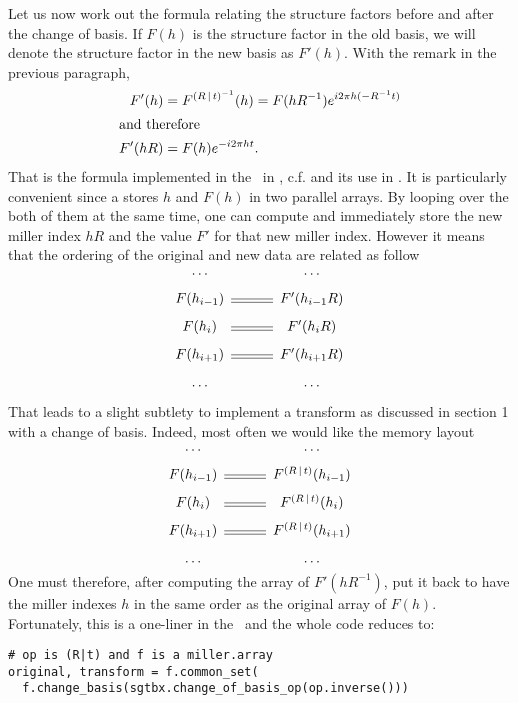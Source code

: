 \documentclass[11pt]{article}
\begin{document}
Let us now work out the formula relating the structure factors before and after the change of basis. If $F(h)$ is the structure factor in the old basis, we will denote the structure factor in the new basis as $F'(h)$. With the remark in the previous paragraph,
\begin{align}
F'(h) &= F^{\left( R\,\vert\, t \right)^{-1}}(h) = F(hR^{-1}) e^{i2\pi h(-R^{-1}t)}\nonumber\\
\intertext{and therefore}
F'(hR) &= F(h)e^{-i2\pi ht}. \label{eqn:change::basis::F}
\end{align}
That is the formula implemented in the \cctbx\ in , c.f.  and its use in . It is particularly convenient since a  stores $h$ and $F(h)$ in two parallel arrays. By looping over the both of them at the same time, one can compute and immediately store the new miller index $hR$ and the value $F'$ for that new miller index. However it means that the ordering of the original and new data are related as follow
\begin{equation}
\begin{CD}
\ldots @. \ldots\\
F(h_{i-1}) @= F'(h_{i-1}R)\\
F(h_i) @= F'(h_iR)\\
F(h_{i+1}) @= F'(h_{i+1}R)\\
\ldots @. \ldots
\end{CD}
\label{eqn:miller::array::change::basis}
\end{equation}

That leads to a slight subtlety to implement a transform as discussed in section 1 with a change of basis. Indeed, most often we would like the memory layout
\begin{equation}
\begin{CD}
\ldots @. \ldots\\
F(h_{i-1}) @= F^{\sym{R}{t}}(h_{i-1})\\
F(h_i) @= F^{\sym{R}{t}}(h_i)\\
F(h_{i+1}) @= F^{\sym{R}{t}}(h_{i+1})\\
\ldots @. \ldots
\end{CD}
\label{eqn:miller::array::transform}
\end{equation}
One must therefore, after computing the array of $F'(hR^{-1})$, put it back to have the miller indexes $h$ in the same order as the original array of $F(h)$. Fortunately, this is a one-liner in the \cctbx\ and the whole code reduces to:
\begin{verbatim}
# op is (R|t) and f is a miller.array
original, transform = f.common_set(
  f.change_basis(sgtbx.change_of_basis_op(op.inverse()))
\end{verbatim}
\end{document}
